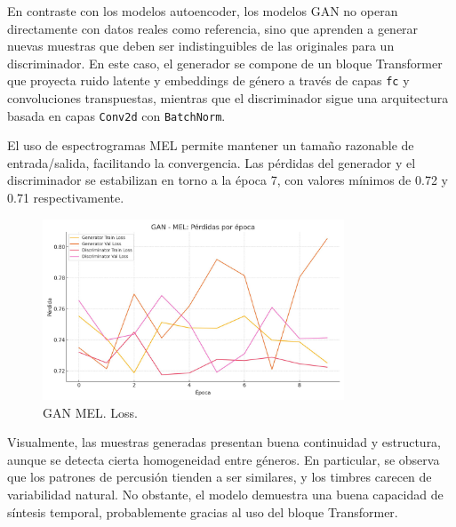 En contraste con los modelos autoencoder, los modelos GAN no operan directamente con datos reales como referencia, sino que aprenden a generar nuevas muestras que deben ser indistinguibles de las originales para un discriminador. En este caso, el generador se compone de un bloque Transformer que proyecta ruido latente y embeddings de género a través de capas \texttt{fc} y convoluciones transpuestas, mientras que el discriminador sigue una arquitectura basada en capas \texttt{Conv2d} con \texttt{BatchNorm}.

El uso de espectrogramas MEL permite mantener un tamaño razonable de entrada/salida, facilitando la convergencia. Las pérdidas del generador y el discriminador se estabilizan en torno a la época 7, con valores mínimos de 0.72 y 0.71 respectivamente.

\begin{figure}[H]
    \centering
    \includegraphics[width=0.8\textwidth]{images/gan_mel_loss_plot.png}
    \caption{GAN MEL. Loss.}
\end{figure}

Visualmente, las muestras generadas presentan buena continuidad y estructura, aunque se detecta cierta homogeneidad entre géneros. En particular, se observa que los patrones de percusión tienden a ser similares, y los timbres carecen de variabilidad natural. No obstante, el modelo demuestra una buena capacidad de síntesis temporal, probablemente gracias al uso del bloque Transformer.

